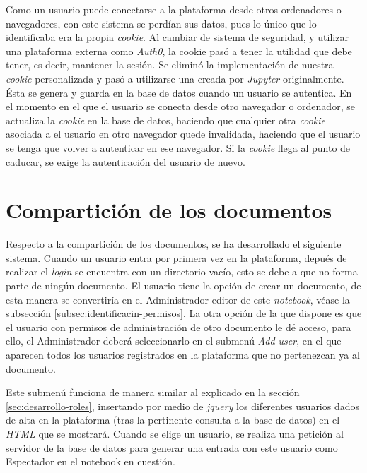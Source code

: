 \documentclass[11pt,spanish,listoffigures,listoftables]{tfgetsinf}
\begin{document}
Como un usuario puede conectarse a la plataforma desde otros ordenadores o navegadores, con este sistema se perdían sus datos, pues lo único que lo identificaba era la propia \textit{cookie}. Al cambiar de sistema de seguridad, y utilizar una plataforma externa como \textit{Auth0}, la cookie pasó a tener la utilidad que debe tener, es decir, mantener la sesión. Se eliminó la implementación de nuestra \textit{cookie} personalizada y pasó a utilizarse una creada por \textit{Jupyter} originalmente. Ésta se genera y guarda en la base de datos cuando un usuario se autentica. En el momento en el que el usuario se conecta desde otro navegador o ordenador, se actualiza la \textit{cookie} en la base de datos, haciendo que cualquier otra \textit{cookie} asociada a el usuario en otro navegador quede invalidada, haciendo que el usuario se tenga que volver a autenticar en ese navegador. Si la \textit{cookie} llega al punto de caducar, se exige la autenticación del usuario de nuevo.



\section{Compartición de los documentos}
\label{sec:desarrollo-comparticion}

Respecto a la compartición de los documentos, se ha desarrollado el siguiente sistema. Cuando un usuario entra por primera vez en la plataforma, depués de realizar el \textit{login} se encuentra con un directorio vacío, esto se debe a que no forma parte de ningún documento. El usuario tiene la opción de crear un documento, de esta manera se convertiría en el Administrador-editor de este \textit{notebook}, véase la subsección \ref{subsec:identificacin-permisos}. La otra opción de la que dispone es que el usuario con permisos de administración de otro documento le dé acceso, para ello, el Administrador deberá seleccionarlo en el submenú \textit{Add user}, en el que aparecen todos los usuarios registrados en la plataforma que no pertenezcan ya al documento.

Este submenú funciona de manera similar al explicado en la sección \ref{sec:desarrollo-roles}, insertando por medio de \textit{jquery} los diferentes usuarios dados de alta en la plataforma (tras la pertinente consulta a la base de datos) en el \textit{HTML} que se mostrará. Cuando se elige un usuario, se realiza una petición al servidor de la base de datos para generar una entrada con este usuario como Espectador en el notebook en cuestión.
\end{document}
